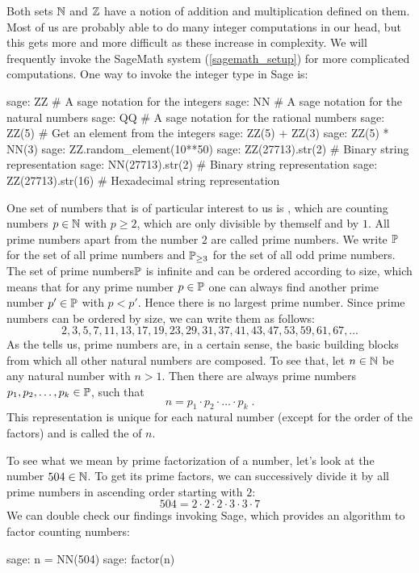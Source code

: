 Both sets $\mathbb{N}$ and $\mathbb{Z}$ have a notion of addition and multiplication defined on them. Most of us are probably able to do many integer computations in our head, but this gets more and more difficult as these increase in complexity.  We will frequently invoke the SageMath system (\ref{sagemath_setup}) for more complicated computations. One way to invoke the integer type in Sage is:
\begin{sagecommandline}
sage: ZZ # A sage notation for the integers
sage: NN # A sage notation for the natural numbers
sage: QQ # A sage notation for the rational numbers
sage: ZZ(5) # Get an element from the integers
sage: ZZ(5) + ZZ(3)
sage: ZZ(5) * NN(3)
sage: ZZ.random_element(10**50)
sage: ZZ(27713).str(2) # Binary string representation
sage: NN(27713).str(2) # Binary string representation
sage: ZZ(27713).str(16) # Hexadecimal string representation
\end{sagecommandline}
One set of numbers that is of particular interest to us is , which are counting numbers $ p \in \mathbb{N} $ with $ p \geq 2 $, which are only divisible by themself and by $ 1 $. All prime numbers apart from the number $ 2 $ are called  prime numbers. We write $ \mathbb{P} $ for the set of all prime numbers and $ \mathbb{P} _{\geq 3} $ for the set of all odd prime numbers. The set of prime numbers$\mathbb{P}$ is infinite and can be ordered according to size, which means that for any prime number $p\in\mathbb{P}$ one can always find another prime number $p'\in\mathbb{P}$ with $p<p'$. Hence there is no largest prime number. Since prime numbers can be ordered by size, we can write them as follows:
\begin{equation}
\label{eq: primenumber_sequence}
2, 3, 5, 7, 11, 13, 17, 19, 23, 29, 31, 37, 41, 43, 47, 53, 59, 61, 67, \ldots
\end{equation}
As the  tells us, prime numbers are, in a certain sense, the basic building blocks from which all other natural numbers are composed. To see that, let $ n \in \mathbb{N} $ be any natural number with $n>1$. Then there are always prime numbers $ p_1, p_2, \ldots, p_k \in \mathbb{P} $, such that
\begin{equation}
\label{def:fundamental_theorem_arithmetics}
n = p_1 \cdot p_2 \cdot \ldots \cdot p_k \;.
\end{equation}
This representation is unique for each natural number (except for the order of the factors) and is called the  of $n$.
\begin{example}\label{ex-prime-factorization} To see what we mean by prime factorization of a number, let's look at the number $504\in\mathbb{N}$. To get its prime factors, we can successively divide it by all prime numbers in ascending order starting with $2$:
\begin{equation*}
504 = 2\cdot 2\cdot 2\cdot 3\cdot 3\cdot 7
\end{equation*}
We can double check our findings invoking Sage, which provides an algorithm to factor counting numbers:
\begin{sagecommandline}
sage: n = NN(504)
sage: factor(n)
\end{sagecommandline}
\end{example}
